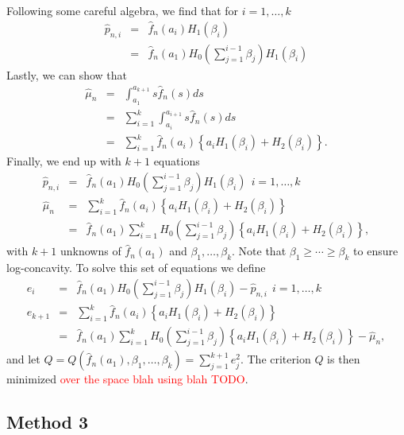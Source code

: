 \documentclass[12pt]{article} %
\newcommand{\comH}[1]{{\noindent \color{blue}#1}}
\begin{document}
Following some careful algebra, we find that for $i=1, \ldots, k$
\begin{eqnarray*}
\widehat p_{n,i}&=& \widehat f_n(a_i) H_1(\beta_i)\\
&=& \widehat f_n(a_1) H_0\left(\sum_{j=1}^{i-1} \beta_j\right) H_1(\beta_i)
\end{eqnarray*}
Lastly, we can show that 
\begin{eqnarray*}
\widehat \mu_n &=& \int_{a_1}^{a_{k+1}} s\widehat f_n(s)ds\\
&=& \sum_{i=1}^k \int_{a_i}^{a_{i+1}} s\widehat f_n(s)ds\\
&=& \sum_{i=1}^k \widehat f_n(a_i)\left\{a_i H_1(\beta_i)+H_2(\beta_i)\right\}.
\end{eqnarray*}
Finally, we end up with $k+1$ equations 
\begin{eqnarray*}
\widehat p_{n,i} &=& \widehat f_n(a_1) H_0\left(\sum_{j=1}^{i-1} \beta_j\right) H_1(\beta_i) \ \ i=1, \dots, k\\
\widehat \mu_n&=& \sum_{i=1}^k \widehat f_n(a_i)\left\{a_i H_1(\beta_i)+H_2(\beta_i)\right\}\\
&=& \widehat f_n(a_1) \sum_{i=1}^k H_0\left(\sum_{j=1}^{i-1} \beta_j\right) \left\{a_i H_1(\beta_i)+H_2(\beta_i)\right\},
\end{eqnarray*}
with $k+1$ unknowns of $\widehat f_n(a_1)$ and $\beta_1, \ldots, \beta_k.$  Note that $\beta_1 \geq \cdots \geq \beta_k$ to ensure log-concavity.  To solve this set of equations we define 
\begin{eqnarray*}
e_i  &=& \widehat f_n(a_1) H_0\left(\sum_{j=1}^{i-1} \beta_j\right) H_1(\beta_i)-\widehat p_{n,i} \ \ i=1, \dots, k\\
e_{k+1}&=& \sum_{i=1}^k \widehat f_n(a_i)\left\{a_i H_1(\beta_i)+H_2(\beta_i)\right\}\\
&=& \widehat f_n(a_1) \sum_{i=1}^k H_0\left(\sum_{j=1}^{i-1} \beta_j\right) \left\{a_i H_1(\beta_i)+H_2(\beta_i)\right\} -\widehat \mu_n,
\end{eqnarray*}
and let $Q=Q(\widehat f_n(a_1), \beta_1, \ldots, \beta_k)=\sum_{j=1}^{k+1}e_j^2.$
The criterion $Q$ is then minimized \textcolor{red}{ over the space blah using blah TODO}.  %

\subsection{Method 3}
\end{document}
